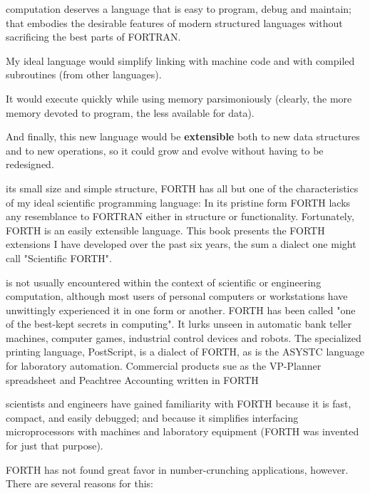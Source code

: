  computation deserves a language that is easy to program, debug and maintain; that embodies the desirable features of modern structured languages without sacrificing the best parts of FORTRAN.

My ideal language would simplify linking with machine code and with compiled subroutines (from other languages).
 
It would execute quickly while using memory parsimoniously (clearly, the more memory devoted to program, the less available for data).

And finally, this new language would be \textbf{extensible} both to new data structures and to new operations, so it could grow and evolve without having to be redesigned.

 its small size and simple structure, FORTH has all but one of the characteristics of my ideal scientific programming language: In its pristine form FORTH lacks any resemblance to FORTRAN either in structure or functionality. Fortunately, FORTH is an easily extensible language. This book presents the FORTH extensions I have developed over the past six years, the sum a dialect one might call "Scientific FORTH". 

 is not usually encountered within the context of scientific or engineering computation, although most users of personal computers or workstations have unwittingly experienced it in one form or another. FORTH has been called "one of the best-kept secrets in computing". It lurks unseen in automatic bank teller machines, computer games, industrial control devices and robots. The specialized printing language, PostScript\textsuperscript{\textregistered}, is a dialect of FORTH, as is the ASYSTC\textsuperscript{\textregistered} language for laboratory automation. Commercial products sue as the VP-Planner\textsuperscript{\textregistered} spreadsheet and Peachtree Accounting\textsuperscript{\textregistered} written in FORTH

 scientists and engineers have gained familiarity with FORTH because it is fast, compact, and easily debugged; and because it simplifies interfacing microprocessors with machines and laboratory equipment (FORTH was invented for just that purpose).
 
FORTH has not found great favor in number-crunching applications, however. There are several reasons for this:

